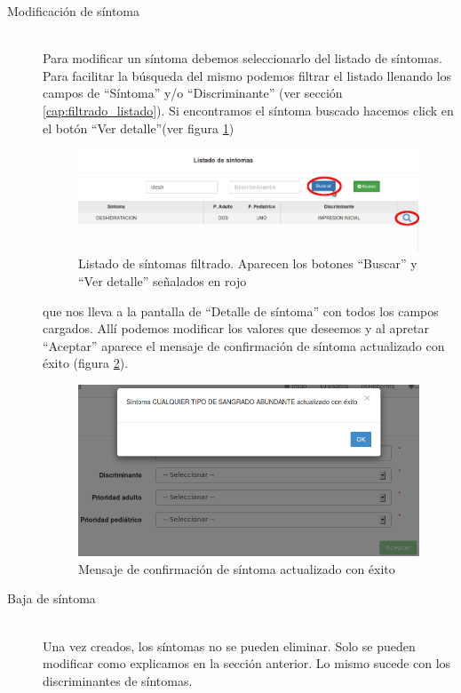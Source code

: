 \begin{description}
\item[Modificación de síntoma] \mbox{} \\
Para modificar un síntoma debemos seleccionarlo del listado de síntomas. Para facilitar la búsqueda del mismo podemos filtrar el listado llenando los campos de ``Síntoma'' y/o ``Discriminante'' (ver sección \ref{cap:filtrado_listado}). Si encontramos el síntoma buscado hacemos click en el botón ``Ver detalle''(ver figura \ref{fig:sintomas_filtro}) 
\begin{figure}
\centerline{\includegraphics[width=1\textwidth]{sintomas_listado_buscar.png}}
\caption{Listado de síntomas filtrado. Aparecen los botones ``Buscar'' y ``Ver detalle'' señalados en rojo}
\label{fig:sintomas_filtro}
\end{figure}
que nos lleva a la pantalla de ``Detalle de síntoma'' con todos los campos cargados. Allí podemos modificar los valores que deseemos y al apretar ``Aceptar'' aparece el mensaje de confirmación de síntoma actualizado con éxito (figura \ref{fig:sintoma_actualizado_con_exito}).
\begin{figure}
\centerline{\includegraphics[width=1\textwidth]{sintoma_actualizado_con_exito.png}}
\caption{Mensaje de confirmación de síntoma actualizado con éxito}
\label{fig:sintoma_actualizado_con_exito}
\end{figure}


\item[Baja de síntoma] \mbox{} \\
Una vez creados, los síntomas no se pueden eliminar. Solo se pueden modificar como explicamos en la sección anterior. Lo mismo sucede con los discriminantes de síntomas.

\end{description}

